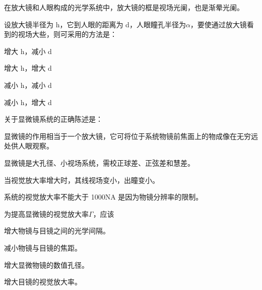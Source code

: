 \documentclass[standard, analysis, notocnum]{ExBook}
\newcommand{\answerarea}[1][8cm]{%
  \par\vspace{2mm}%
  \noindent{\color{themeColor!35}\rule{\linewidth}{0.4pt}}\par
  \noindent\begin{minipage}[t][#1][t]{\linewidth}\vspace{0pt}\end{minipage}\par
  \noindent{\color{themeColor!35}\rule{\linewidth}{0.4pt}}\par
}
\begin{document}
\begin{qitems}
\begin{bbox}
\par\noindent\hspace{2em}在放大镜和人眼构成的光学系统中，放大镜的框是视场光阑，也是渐晕光阑。
\answerarea[3.5cm]
\end{bbox}
\begin{bbox}
\qitem 设放大镜半径为 h，它到人眼的距离为 d，人眼瞳孔半径为$\alpha$，要使通过放大镜看到的视场大些，则可采用的方法是：
\par\noindent\hspace{2em}增大 h，减小 d
\par\noindent\hspace{2em}增大 h，增大 d
\par\noindent\hspace{2em}减小 h，减小 d
\par\noindent\hspace{2em}减小 h，增大 d
\answerarea[3.5cm]
\end{bbox}
\begin{bbox}
\qitem 关于显微镜系统的正确陈述是：
\par\noindent\hspace{2em}显微镜的作用相当于一个放大镜，它可将位于系统物镜前焦面上的物成像在无穷远处供人眼观察。
\par\noindent\hspace{2em}显微镜是大孔径、小视场系统，需校正球差、正弦差和慧差。
\par\noindent\hspace{2em}当视觉放大率增大时，其线视场变小，出瞳变小。
\par\noindent\hspace{2em}系统的视觉放大率不能大于 1000NA 是因为物镜分辨率的限制。
\answerarea[3.5cm]
\end{bbox}
\begin{bbox}
\qitem 为提高显微镜的视觉放大率$\Gamma$，应该
\par\noindent\hspace{2em}增大物镜与目镜之间的光学间隔。
\par\noindent\hspace{2em}减小物镜与目镜的焦距。
\par\noindent\hspace{2em}增大显微物镜的数值孔径。
\par\noindent\hspace{2em}增大目镜的视觉放大率。
\answerarea[3.5cm]
\end{bbox}

\end{qitems}
\end{document}
